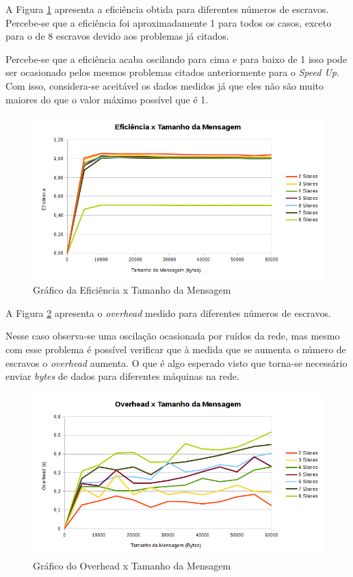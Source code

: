 \documentclass[
	12pt,				%
    oneside,			%
	a4paper,			%
	english,			%
	brazil,				%
	]{abntex2}
\begin{document}
A Figura \ref{fig:dist:eficienciaXtamanho_msg} apresenta a eficiência obtida para diferentes números de escravos. Percebe-se 
que a eficiência foi aproximadamente 1 para todos os casos, exceto para o de 8 escravos devido aos problemas já citados.

Percebe-se que a eficiência acaba oscilando para cima e para baixo de 1 isso pode ser ocasionado pelos mesmos problemas citados anteriormente para o \textit{Speed Up}. Com isso, considera-se aceitável os dados medidos já que eles não são muito
maiores do que o valor máximo possível que é 1.


\begin{figure}[!htb]
\centering
\includegraphics[scale=0.65]{figuras/eficiencia_distribuido.png}
\caption{Gráfico da Eficiência x Tamanho da Mensagem}
\label{fig:dist:eficienciaXtamanho_msg}
\end{figure}

A Figura \ref{fig:dist:overheadXtamanho_msg} apresenta o \textit{overhead} medido para diferentes números de escravos. 

Nesse caso observa-se uma oscilação ocasionada por ruídos da rede, mas mesmo com esse problema é possível verificar que à
medida que se aumenta o número de escravos o \textit{overhead} aumenta. O que é algo esperado visto que torna-se necessário 
enviar \textit{bytes} de dados para diferentes máquinas na rede.

\begin{figure}[!htb]
\centering
\includegraphics[scale=0.65]{figuras/overhead_distribuido.png}
\caption{Gráfico do Overhead x Tamanho da Mensagem}
\label{fig:dist:overheadXtamanho_msg}
\end{figure}
\end{document}
